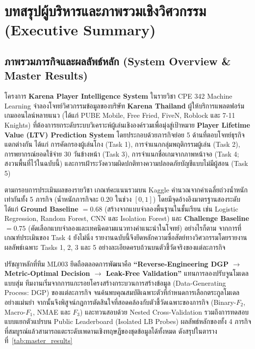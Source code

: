 \tableofcontents
\clearpage
\listoffigures
\listoftables
\clearpage

\section{บทสรุปผู้บริหารและภาพรวมเชิงวิศวกรรม (Executive Summary)}
\label{sec:exec_summary}

\subsection{ภาพรวมภารกิจและผลลัพธ์หลัก (System Overview \& Master Results)}
\label{subsec:sys_overview}

โครงการ \textbf{Karena Player Intelligence System} ในรายวิชา CPE 342 Machine Learning จำลองโจทย์วิศวกรรมข้อมูลของบริษัท \textbf{Karena Thailand} ผู้ให้บริการแพลตฟอร์มเกมออนไลน์หลายแนว (ได้แก่ PUBE Mobile, Free Fried, FiveN, Roblock และ 7-11 Knights) ที่ต้องการยกระดับระบบวิเคราะห์ผู้เล่นเชิงองค์รวมเพื่อมุ่งสู่เป้าหมาย \textbf{Player Lifetime Value (LTV) Prediction System} โดยประกอบด้วยภารกิจย่อย 5 ด้านที่ตอบโจทย์ธุรกิจแตกต่างกัน ได้แก่ การคัดกรองผู้เล่นโกง (Task 1), การจำแนกกลุ่มพฤติกรรมผู้เล่น (Task 2), การพยากรณ์ยอดใช้จ่าย 30 วันข้างหน้า (Task 3), การจำแนกชื่อเกมจากภาพหน้าจอ (Task 4; สงวนพื้นที่ไว้ในฉบับนี้) และการเฝ้าระวังความผิดปกติทางความปลอดภัยบัญชีแบบไม่มีผู้สอน (Task 5)

ตามกรอบการประเมินผลของรายวิชา เกณฑ์คะแนนรวมบน Kaggle คำนวณจากค่าเฉลี่ยถ่วงน้ำหนักเท่ากันทั้ง 5 ภารกิจ (น้ำหนักภารกิจละ $0.20$ ในช่วง $[0, 1]$) โดยมีจุดอ้างอิงมาตรฐานสองระดับ ได้แก่ \textbf{Ground Baseline $= 0.68$} (สร้างจากแบบจำลองพื้นฐานในชั้นเรียน เช่น Logistic Regression, Random Forest, CNN และ Isolation Forest) และ \textbf{Challenge Baseline $= 0.75$} (คัดเลือกแบบจำลองและเทคนิคตามแนวทางคำแนะนำในโจทย์) อย่างไรก็ตาม จากการที่เกณฑ์ประเมินของ Task 4 ยังไม่นิ่ง รายงานฉบับนี้จึงยึดหลักความซื่อสัตย์ทางวิศวกรรมโดยรายงานผลลัพธ์เฉพาะ Tasks 1, 2, 3 และ 5 อย่างละเอียดครบถ้วนบนตัวชี้วัดจริงของแต่ละภารกิจ

ปรัชญาหลักที่ทีม ML003 ยึดถือตลอดการพัฒนาคือ \textbf{``Reverse-Engineering DGP $\to$ Metric-Optimal Decision $\to$ Leak-Free Validation''} แทนการลองปรับจูนโมเดลแบบสุ่ม ทีมงานเริ่มจากการแกะรอยโครงสร้างกระบวนการสร้างข้อมูล (Data-Generating Process: DGP) ของแต่ละภารกิจ จนค้นพบคุณสมบัติเฉพาะตัวที่กำหนดการเลือกตระกูลโมเดลอย่างแม่นยำ จากนั้นจึงพิสูจน์กฎการตัดสินใจที่สอดคล้องกับตัวชี้วัดเฉพาะของภารกิจ (Binary-$F_2$, Macro-$F_1$, NMAE และ $F_3$) และทวนสอบด้วย Nested Cross-Validation รวมถึงการทดสอบแบบแยกตัวแปรบน Public Leaderboard (Isolated LB Probes) ผลลัพธ์หลักของทั้ง 4 ภารกิจที่สมบูรณ์แล้วสามารถแตะระดับเพดานเชิงทฤษฎีของชุดข้อมูลได้ทั้งหมด ดังสรุปในตารางที่~\ref{tab:master_results}

